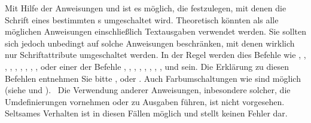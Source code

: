 \begin{Declaration}
\end{Declaration}%
Mit%
 Hilfe der Anweisungen  und  ist es
möglich, die  festzulegen, mit denen die Schrift eines
bestimmten s umgeschaltet wird. Theoretisch könnten als
 alle möglichen Anweisungen einschließlich Textausgaben
verwendet werden.  Sie  sollten sich jedoch unbedingt auf
solche Anweisungen beschränken, mit denen wirklich nur Schriftattribute
umgeschaltet werden. In der Regel werden dies Befehle wie ,
, , , ,
, , , ,
 oder einer der Befehle , ,
, , , ,
, ,  und 
sein. Die Erklärung zu diesen Befehlen entnehmen Sie bitte \cite{l2kurz},
\cite{latex:usrguide} oder \cite{latex:fntguide}. Auch Farbumschaltungen wie
 sind möglich (siehe \cite{package:graphics} und
\cite{package:xcolor}).%
\iffalse %
\ Das Verhalten bei Verwendung anderer Anweisungen, inbesondere solcher, die
zu Umdefinierungen führen oder Ausgaben tätigen, ist nicht
definiert. Seltsames Verhalten ist möglich und stellt keinen Fehler dar.
\else%
\ Die Verwendung anderer Anweisungen, inbesondere solcher, die Umdefinierungen
vornehmen oder zu Ausgaben führen, ist nicht vorgesehen.  Seltsames Verhalten
ist in diesen Fällen möglich und stellt keinen Fehler dar.%
\fi

